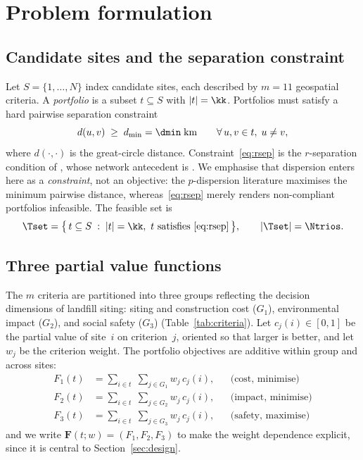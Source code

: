 
\section{Problem formulation}
\label{sec:problem}

\subsection{Candidate sites and the separation constraint}

Let $S=\{1,\dots,N\}$ index candidate sites, each described by $m=11$
geospatial criteria.
A \emph{portfolio} is a subset $t\subseteq S$ with $|t|=\kk$.
Portfolios must satisfy a hard pairwise separation constraint
\begin{equation}
  \label{eq:rsep}
  d(u,v) \;\ge\; d_{\min}=\dmin\;\text{km}
  \qquad \forall\, u,v\in t,\; u\neq v,
\end{equation}
where $d(\cdot,\cdot)$ is the great-circle distance.
Constraint~\eqref{eq:rsep} is the $r$-separation condition of
\citet{Erkut1996}, whose network antecedent is \citet{MoonChaudhry1984}.
We emphasise that dispersion enters here as a \emph{constraint}, not an
objective: the $p$-dispersion literature \citep{Kuby1987,Marti2022}
maximises the minimum pairwise distance, whereas~\eqref{eq:rsep} merely
renders non-compliant portfolios infeasible.
The feasible set is
\begin{equation}
  \label{eq:T}
  \Tset = \bigl\{\,t\subseteq S \;:\; |t|=\kk,\ t \text{ satisfies }
    \eqref{eq:rsep}\,\bigr\},
  \qquad |\Tset| = \Ntrios.
\end{equation}

\subsection{Three partial value functions}

The $m$ criteria are partitioned into three groups reflecting the
decision dimensions of landfill siting: siting and construction cost
($G_1$), environmental impact ($G_2$), and social safety ($G_3$)
(Table~\ref{tab:criteria}).
Let $c_j(i)\in[0,1]$ be the partial value of site~$i$ on criterion~$j$,
oriented so that larger is better, and let $w_j$ be the criterion weight.
The portfolio objectives are additive within group and across sites:
\begin{align}
  F_1(t) &= \sum_{i\in t}\;\sum_{j\in G_1} w_j\,c_j(i),
    && \text{(cost, minimise)} \label{eq:F1} \\
  F_2(t) &= \sum_{i\in t}\;\sum_{j\in G_2} w_j\,c_j(i),
    && \text{(impact, minimise)} \label{eq:F2} \\
  F_3(t) &= \sum_{i\in t}\;\sum_{j\in G_3} w_j\,c_j(i),
    && \text{(safety, maximise)} \label{eq:F3}
\end{align}
and we write $\mathbf{F}(t;w)=(F_1,F_2,F_3)$ to make the weight
dependence explicit, since it is central to
Section~\ref{sec:design}.

